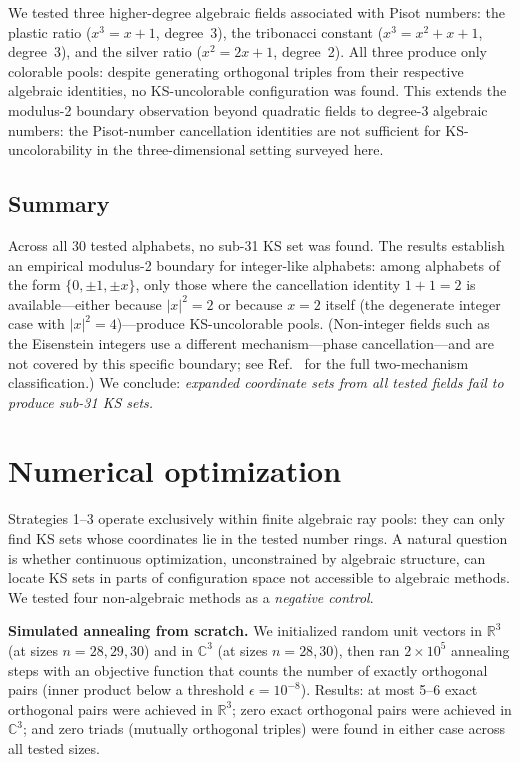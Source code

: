 \documentclass[twocolumn,pra,superscriptaddress,nofootinbib]{revtex4-2}
\newcommand{\R}{\mathbb{R}}
\newcommand{\C}{\mathbb{C}}
\begin{document}
We tested three higher-degree algebraic fields associated with Pisot numbers:
the plastic ratio ($x^3 = x+1$, degree~3), the tribonacci constant
($x^3 = x^2+x+1$, degree~3), and the silver ratio ($x^2 = 2x+1$, degree~2).
All three produce only colorable pools: despite generating orthogonal triples
from their respective algebraic identities, no KS-uncolorable configuration
was found. This extends the modulus-2 boundary observation beyond quadratic
fields to degree-3 algebraic numbers: the Pisot-number cancellation identities
are not sufficient for KS-uncolorability in the three-dimensional setting
surveyed here.

\subsection{Summary}

Across all 30 tested alphabets, no sub-31 KS set was found. The results
establish an empirical modulus-2 boundary for integer-like alphabets: among
alphabets of the form $\{0,\pm 1,\pm x\}$, only those where the cancellation
identity $1 + 1 = 2$ is available---either because $|x|^2 = 2$ or because
$x = 2$ itself (the degenerate integer case with $|x|^2 = 4$)---produce
KS-uncolorable pools. (Non-integer fields such as the Eisenstein
integers use a different mechanism---phase cancellation---and are not
covered by this specific boundary; see Ref.~\cite{Kernaghan2026algebraic}
for the full two-mechanism classification.) We conclude: \textit{expanded
coordinate sets from all tested fields fail to produce sub-31 KS sets.}

\section{Numerical optimization}
\label{sec:numerical}

Strategies 1--3 operate exclusively within finite algebraic ray pools: they can only find KS sets whose coordinates lie in the tested number rings. A natural question is whether continuous optimization, unconstrained by algebraic structure, can locate KS sets in parts of configuration space not accessible to algebraic methods. We tested four non-algebraic methods as a \emph{negative control}.

\textbf{Simulated annealing from scratch.} We initialized random unit vectors in $\R^3$ (at sizes $n = 28, 29, 30$) and in $\C^3$ (at sizes $n = 28, 30$), then ran $2 \times 10^5$ annealing steps with an objective function that counts the number of exactly orthogonal pairs (inner product below a threshold $\epsilon = 10^{-8}$). Results: at most 5--6 exact orthogonal pairs were achieved in $\R^3$; zero exact orthogonal pairs were achieved in $\C^3$; and zero triads (mutually orthogonal triples) were found in either case across all tested sizes.
\end{document}
